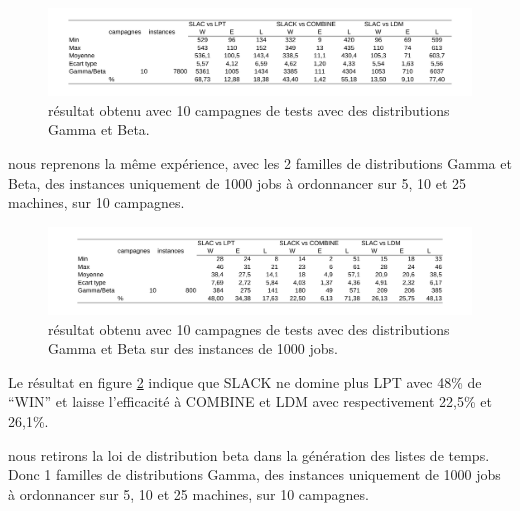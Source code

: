 \documentclass[a4paper,12pt]{report}
\theoremstyle{plain}				%
\theoremstyle{definition}				%
\begin{document}
\begin{figure}
{\centering
\includegraphics[width=\columnwidth]{5_Resultat_Reproduction10GammaBeta.pdf}
\caption{résultat obtenu avec 10 campagnes de tests avec des distributions Gamma et Beta.}
\label{fig:resultatReproduction10GammaBeta}
\par}
\end{figure}

\bigskip
nous reprenons la même expérience, avec les 2 familles de distributions Gamma et Beta, 
  des instances uniquement de 1000 jobs à ordonnancer sur 5, 10 et 25 machines,
  sur 10 campagnes.

\begin{figure}
{\centering
\includegraphics[width=\columnwidth]{6_Resultat_Reproduction10GammaBeta1000.pdf}
\caption{résultat obtenu avec 10 campagnes de tests avec des distributions Gamma et Beta sur des instances de 1000 jobs.}
\label{fig:resultatReproduction10GammaBeta1000}
\par}
\end{figure}

Le résultat en figure \ref{fig:resultatReproduction10GammaBeta1000} indique que 
  SLACK ne domine plus LPT avec 48\% de ``WIN'' et
  laisse l'efficacité à COMBINE et LDM avec respectivement 22,5\% et 26,1\%.


\bigskip
nous retirons la loi de distribution beta dans la génération des listes de temps.
Donc 1 familles de distributions Gamma, 
  des instances uniquement de 1000 jobs à ordonnancer sur 5, 10 et 25 machines,
  sur 10 campagnes.
\end{document}
